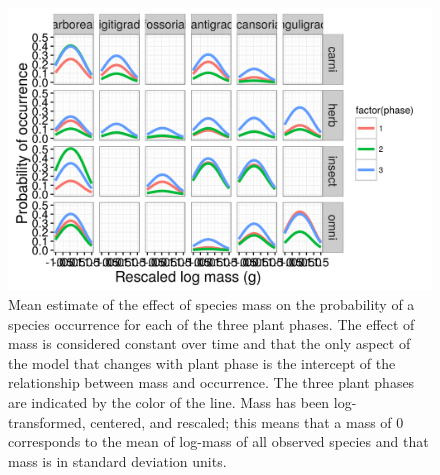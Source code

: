 \documentclass[12pt,letterpaper]{article}
\begin{document}
\begin{figure}[ht]
  \centering
  \includegraphics[width=\textwidth,height=0.8\textheight,keepaspectratio=true]{figure/mass_on_pres}
  \caption[Effect of mass on probability of species occurrence as estimated from the pure-presence model]{Mean estimate of the effect of species mass on the probability of a species occurrence for each of the three plant phases. The effect of mass is considered constant over time and that the only aspect of the model that changes with plant phase is the intercept of the relationship between mass and occurrence. The three plant phases are indicated by the color of the line. Mass has been log-transformed, centered, and rescaled; this means that a mass of 0 corresponds to the mean of log-mass of all observed species and that mass is in standard deviation units.}
  \label{fig:mass_occur}
\end{figure}
\end{document}
